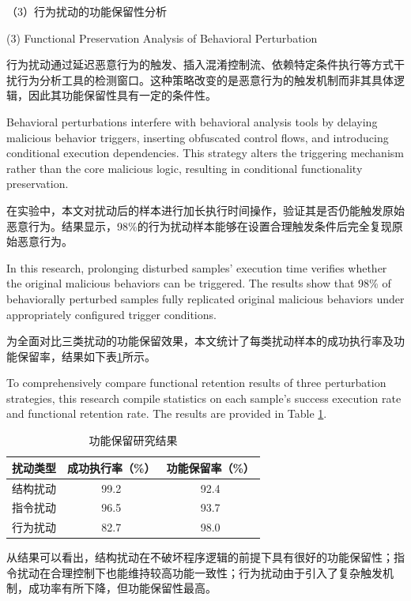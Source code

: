 （3）行为扰动的功能保留性分析

(3) Functional Preservation Analysis of Behavioral Perturbation

行为扰动通过延迟恶意行为的触发、插入混淆控制流、依赖特定条件执行等方式干扰行为分析工具的检测窗口。这种策略改变的是恶意行为的触发机制而非其具体逻辑，因此其功能保留性具有一定的条件性。

Behavioral perturbations interfere with behavioral analysis tools by delaying malicious behavior triggers, inserting obfuscated control flows, and introducing conditional execution dependencies. This strategy alters the triggering mechanism rather than the core malicious logic, resulting in conditional functionality preservation.

在实验中，本文对扰动后的样本进行加长执行时间操作，验证其是否仍能触发原始恶意行为。结果显示，98\%的行为扰动样本能够在设置合理触发条件后完全复现原始恶意行为。

In this research, prolonging disturbed samples' execution time verifies whether the original malicious behaviors can be triggered. The results show that 98\% of behaviorally perturbed samples fully replicated original malicious behaviors under appropriately configured trigger conditions.

为全面对比三类扰动的功能保留效果，本文统计了每类扰动样本的成功执行率及功能保留率，结果如下表\ref{tab:5.12}所示。

To comprehensively compare functional retention results of three perturbation strategies, this research compile statistics on each sample's success execution rate and functional retention rate. The results are provided in Table \ref{tab:5.12}.

\begin{table}[htb]
	\centering
	\caption{功能保留研究结果}
	\label{tab:5.12}
	\begin{tabular*}{0.9\textwidth}{@{\extracolsep{\fill}}ccc}
		\toprule
		扰动类型 & 成功执行率（\%） & 功能保留率（\%） \\
		\midrule
		结构扰动 & 99.2 & 92.4 \\
		指令扰动 & 96.5 & 93.7 \\
		行为扰动 & 82.7 & 98.0 \\
		\bottomrule
	\end{tabular*}
\end{table}

从结果可以看出，结构扰动在不破坏程序逻辑的前提下具有很好的功能保留性；指令扰动在合理控制下也能维持较高功能一致性；行为扰动由于引入了复杂触发机制，成功率有所下降，但功能保留性最高。

